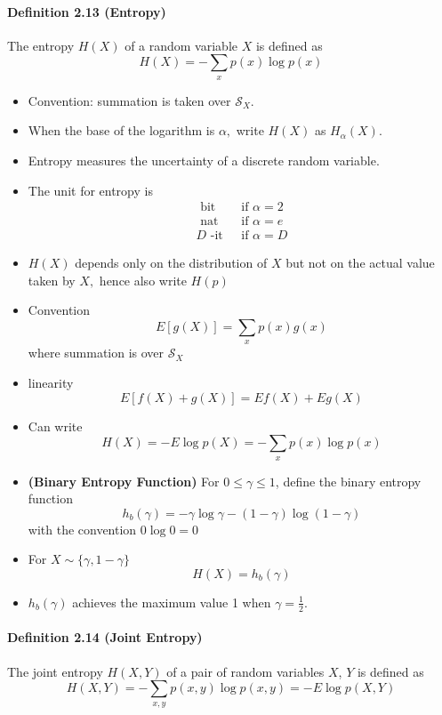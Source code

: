 \documentclass[8pt]{article}
\begin{document}
\begin{tcolorbox}
\paragraph{Definition 2.13 (Entropy)} The entropy $H(X)$ of a random variable $X$ is defined as
$$
H(X)=-\sum_{x} p(x) \log p(x)
$$
\end{tcolorbox}
\begin{itemize}
	\item Convention: summation is taken over $\mathcal{S}_{X}$.
	\item When the base of the logarithm is $\alpha,$ write $H(X)$ as $H_{\alpha}(X)$.
	\item Entropy measures the uncertainty of a discrete random variable.
	\item The unit for entropy is
			$$
			\begin{array}{ll}
			\text { bit } & \text { if } \alpha=2 \\
			\text { nat } & \text { if } \alpha=e \\
			D \text { -it } & \text { if } \alpha=D
			\end{array}
			$$
	\item $H(X)$ depends only on the distribution of $X$ but not on the actual value taken by $X,$ hence also write $H(p)$
	\item Convention
		$$
		E[g(X)]=\sum_{x} p(x) g(x)
		$$
		where summation is over $\mathcal{S}_{X}$
	\item linearity
		$$
		E[f(X)+g(X)]=E f(X)+E g(X)
		$$
	\item Can write
$$
H(X)=-E \log p(X)=-\sum_{x} p(x) \log p(x)
$$
	\item \textbf{(Binary Entropy Function)}
	For $0 \leq \gamma \leq 1$, define the binary entropy function
	$$
	h_{b}(\gamma)=-\gamma \log \gamma-(1-\gamma) \log (1-\gamma)
	$$
	with the convention $0 \log 0=0$
	\item For $X \sim\{\gamma, 1-\gamma\}$
	$$
	H(X)=h_{b}(\gamma)
	$$
	\item  $h_{b}(\gamma)$ achieves the maximum value 1 when $\gamma=\frac{1}{2}$.
\end{itemize}
\begin{tcolorbox}
\paragraph{Definition 2.14 (Joint Entropy)} The joint entropy $H(X, Y)$ of a pair of random variables $X$, $Y$ is defined as
$$
H(X, Y)=-\sum_{x, y} p(x, y) \log p(x, y)=-E \log p(X, Y)
$$
\end{tcolorbox}
\end{document}
